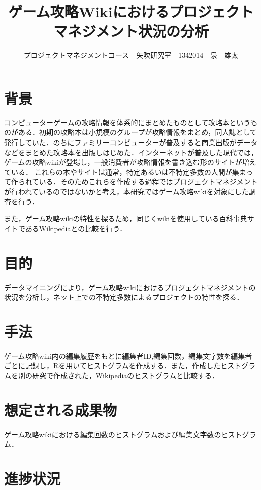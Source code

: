 \documentclass[uplatex,twocolumn,dvipdfmx]{jsarticle}
\title{\vspace{-5mm}\fontsize{14pt}{0pt}\selectfont  ゲーム攻略Wikiにおけるプロジェクトマネジメント状況の分析}
\author{\normalsize プロジェクトマネジメントコース　矢吹研究室　1342014　泉　雄太}
\date{}
\begin{document}
\fontsize{10.5pt}{\baselineskip}\selectfont
\maketitle





\section{背景}

コンピューターゲームの攻略情報を体系的にまとめたものとして攻略本というものがある．初期の攻略本は小規模のグループが攻略情報をまとめ，同人誌として発行していた．のちにファミリーコンピューターが普及すると商業出版がデータなどをまとめた攻略本を出版しはじめた．インターネットが普及した現代では，ゲームの攻略wikiが登場し，一般消費者が攻略情報を書き込む形のサイトが増えている．
これらの本やサイトは通常，特定あるいは不特定多数の人間が集まって作られている．そのためこれらを作成する過程ではプロジェクトマネジメントが行われているのではないかと考え，本研究ではゲーム攻略wikiを対象にした調査を行う．

また，ゲーム攻略wikiの特性を探るため，同じくwikiを使用している百科事典サイトであるWikipediaとの比較を行う．



\section{目的}

データマイニングにより，ゲーム攻略wikiにおけるプロジェクトマネジメントの状況を分析し，ネット上での不特定多数によるプロジェクトの特性を探る．

\section{手法}

ゲーム攻略wiki内の編集履歴をもとに編集者ID,編集回数，編集文字数を編集者ごとに記録し，Rを用いてヒストグラムを作成する．また，作成したヒストグラムを別の研究で作成された，Wikipediaのヒストグラムと比較する．

\section{想定される成果物}

ゲーム攻略wikiにおける編集回数のヒストグラムおよび編集文字数のヒストグラム．

\section{進捗状況}
\end{document}
